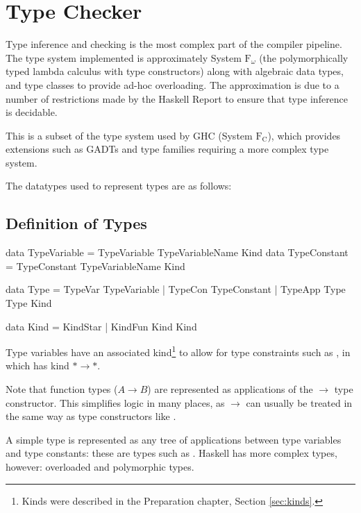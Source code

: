 \documentclass[dissertation.tex]{subfiles}
\begin{document}
\section{Type Checker}
{
    Type inference and checking is the most complex part of the compiler pipeline. The type system implemented is approximately System \(\text{F}_\omega\) (the polymorphically typed lambda calculus with type constructors) along with algebraic data types, and type classes to provide ad-hoc overloading. The approximation is due to a number of restrictions made by the Haskell Report to ensure that type inference is decidable.
    
    This is a subset of the type system used by GHC (System \(\text{F}_\text{C}\)), which provides extensions such as GADTs and type families requiring a more complex type system.

    The datatypes used to represent types are as follows:

    \subsection{Definition of Types}
    {
        \begin{haskellfigure}
        data TypeVariable = TypeVariable TypeVariableName Kind
        data TypeConstant = TypeConstant TypeVariableName Kind

        data Type = TypeVar TypeVariable
                  | TypeCon TypeConstant
                  | TypeApp Type Type Kind

        data Kind = KindStar
                  | KindFun Kind Kind
        \end{haskellfigure}

        Type variables have an associated kind\footnote{Kinds were described in the Preparation chapter, Section \ref{sec:kinds}.} to allow for type constraints such as , in which  has kind \(*\rightarrow*\).

        Note that function types (\(A \rightarrow B\)) are represented as applications of the \(\rightarrow\) type constructor. This simplifies logic in many places, as \(\rightarrow\) can usually be treated in the same way as type constructors like .

        A simple type is represented as any tree of applications between type variables and type constants: these are types such as . Haskell has more complex types, however: overloaded and polymorphic types.

}}
\end{document}
